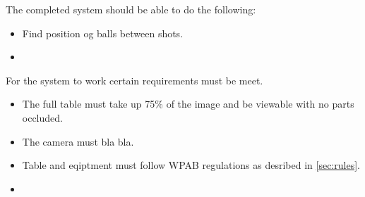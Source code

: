 The completed system should be able to do the following:

\begin{itemize}
	\item Find position og balls between shots.
	\item 
\end{itemize}

For the system to work certain requirements must be meet.

\begin{itemize}
	\item The full table must take up 75\% of the image and  be viewable with no parts occluded.
	\item The camera must bla bla.
	\item Table and eqiptment must follow WPAB regulations as desribed in \ref{sec:rules}.
	\item 
\end{itemize}